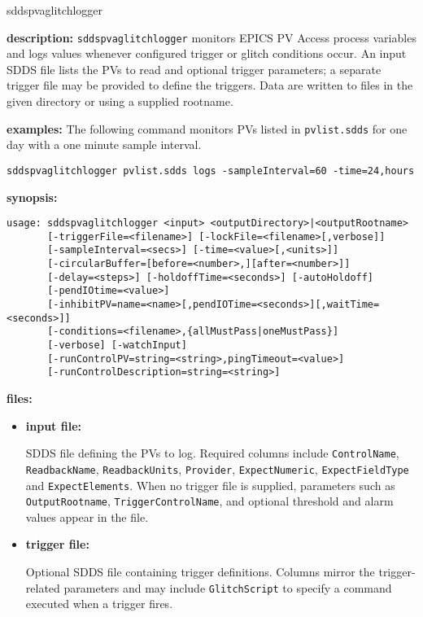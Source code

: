 \begin{sddsprog}{sddspvaglitchlogger}
\item \textbf{description:}
\verb+sddspvaglitchlogger+ monitors EPICS PV Access process variables and
logs values whenever configured trigger or glitch conditions occur.  An input
SDDS file lists the PVs to read and optional trigger parameters; a separate
trigger file may be provided to define the triggers.  Data are written to
files in the given directory or using a supplied rootname.

\item \textbf{examples:}
The following command monitors PVs listed in \verb+pvlist.sdds+ for one day
with a one minute sample interval.
\begin{verbatim}
sddspvaglitchlogger pvlist.sdds logs -sampleInterval=60 -time=24,hours
\end{verbatim}

\item \textbf{synopsis:}
\begin{verbatim}
usage: sddspvaglitchlogger <input> <outputDirectory>|<outputRootname>
       [-triggerFile=<filename>] [-lockFile=<filename>[,verbose]]
       [-sampleInterval=<secs>] [-time=<value>[,<units>]]
       [-circularBuffer=[before=<number>,][after=<number>]]
       [-delay=<steps>] [-holdoffTime=<seconds>] [-autoHoldoff]
       [-pendIOtime=<value>]
       [-inhibitPV=name=<name>[,pendIOTime=<seconds>][,waitTime=<seconds>]]
       [-conditions=<filename>,{allMustPass|oneMustPass}]
       [-verbose] [-watchInput]
       [-runControlPV=string=<string>,pingTimeout=<value>]
       [-runControlDescription=string=<string>]
\end{verbatim}

\item \textbf{files:}
  \begin{itemize}
  \item \textbf{input file:}\par
    SDDS file defining the PVs to log. Required columns include
    {\tt ControlName}, {\tt ReadbackName}, {\tt ReadbackUnits},
    {\tt Provider}, {\tt ExpectNumeric}, {\tt ExpectFieldType} and
    {\tt ExpectElements}. When no trigger file is supplied, parameters such as
    {\tt OutputRootname}, {\tt TriggerControlName}, and optional threshold and
    alarm values appear in the file.
  \item \textbf{trigger file:}\par
    Optional SDDS file containing trigger definitions. Columns mirror the
    trigger-related parameters and may include {\tt GlitchScript} to specify a
    command executed when a trigger fires.
  \end{itemize}


\end{sddsprog}
